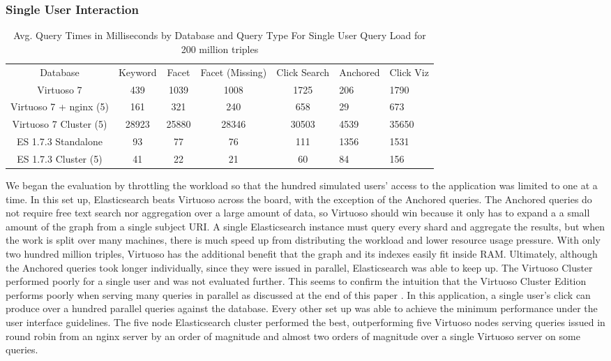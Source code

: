 \subsubsection{Single User Interaction}
 \begin{table} 
    \begin{tabular}{ c c c c c }
        Database & Keyword & Facet & Facet (Missing) & Click Search & Anchored & Click Viz \\ 
        Virtuoso 7 & 439 & 1039 & 1008 & 1725 & 206 &  1790 \\ 
        Virtuoso 7 + nginx (5) & 161 & 321 & 240 & 658 & 29 &  673 \\ 
        Virtuoso 7 Cluster (5) & 28923 & 25880 & 28346 & 30503 & 4539 & 35650\\
        ES 1.7.3 Standalone & 93 & 77 & 76 & 111 & 1356 & 1531 \\ 
        ES 1.7.3 Cluster (5) & 41 & 22 & 21 & 60 & 84 & 156 \\ 
    \end{tabular} 
    \caption{Avg. Query Times in Milliseconds by Database and Query Type For Single User Query Load for 200 million triples}
    \label{table:qt_single_user_200m}
\end{table}
We began the evaluation by throttling the workload so that the hundred simulated users' access to the application was limited to one at a time.
In this set up, Elasticsearch beats Virtuoso across the board, with the exception of the Anchored queries.  
The Anchored queries do not require free text search nor aggregation over a large amount of data, so Virtuoso should win because it only has to expand a a small amount of the graph from a single subject URI.
A single Elasticsearch instance must query every shard and aggregate the results, but when the work is split over many machines, there is much speed up from distributing the workload and lower resource usage pressure.   
With only two hundred million triples, Virtuoso has the additional benefit that the graph and its indexes easily fit inside RAM.
Ultimately, although the Anchored queries took longer individually, since they were issued in parallel, Elasticsearch was able to keep up.
The Virtuoso Cluster performed poorly for a single user and was not evaluated further. 
This seems to confirm the intuition that the Virtuoso Cluster Edition performs poorly when serving many queries in parallel as discussed at the end of this paper \cite{harthlinked}.  
In this application, a single user's click can produce over a hundred parallel queries against the database. 
Every other set up was able to achieve the minimum performance under the user interface guidelines. 
The five node Elasticsearch cluster performed the best, outperforming five Virtuoso nodes serving queries issued in round robin from an nginx server by an order of magnitude and almost two orders of magnitude over a single Virtuoso server on some queries. 

